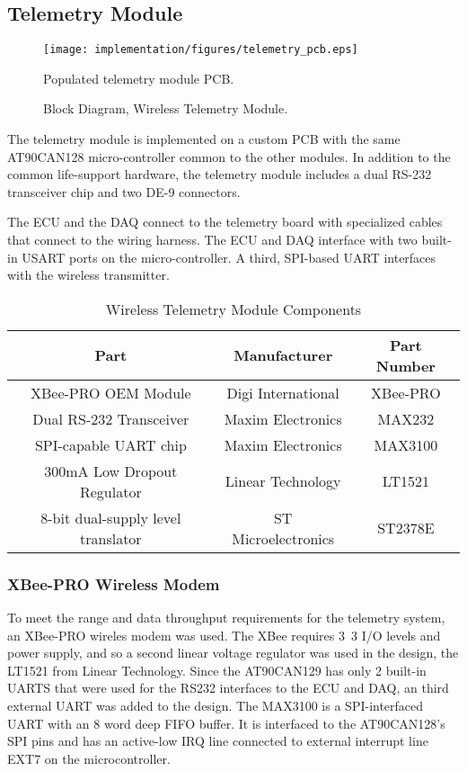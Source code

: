 \subsection{Telemetry Module}

\begin{figure}[H]
\centering
\texttt{[image: implementation/figures/telemetry\_pcb.eps]}
\caption{Populated telemetry module PCB.}\label{fig:telemetry_pcb}
\end{figure}


\begin{figure}[H]
\centering

\caption{Block Diagram, Wireless Telemetry Module.\label{fig:tele_tx_overview}}
\end{figure}

The telemetry module is implemented on a custom PCB with the same AT90CAN128 micro-controller common to the other modules. In addition to the common life-support hardware, the telemetry module includes a dual RS-232 transceiver chip and two DE-9 connectors. 

The ECU and the DAQ connect to the telemetry board with specialized cables that connect to the wiring harness. The ECU and DAQ interface with two built-in USART ports on the micro-controller. A third, SPI-based UART interfaces with the wireless transmitter.

\begin{table}[H]
  \caption{Wireless Telemetry Module Components\label{tab:telmetry_module_components}}
  \centering
    \begin{tabular}{|c|c|c|}
      \hline 
      Part & Manufacturer & Part Number\tabularnewline
      \hline
      \hline
      XBee-PRO OEM Module & Digi International & XBee-PRO\tabularnewline
      \hline 
      Dual RS-232 Transceiver & Maxim Electronics & MAX232\tabularnewline
      \hline 
      SPI-capable UART chip & Maxim Electronics & MAX3100\tabularnewline
      \hline 
      300mA Low Dropout Regulator & Linear Technology & LT1521\tabularnewline
      \hline
      8-bit dual-supply level translator & ST Microelectronics & ST2378E\tabularnewline
      \hline
    \end{tabular}
\end{table}


\subsubsection{XBee-PRO Wireless Modem}

To meet the range and data throughput requirements for the telemetry system, an XBee-PRO wireles modem was used. The XBee requires \unit{3.3}{\volt} I/O levels and power supply, and so a second linear voltage regulator was used in the design, the LT1521 from Linear Technology. Since the AT90CAN129 has only 2 built-in UARTS that were used for the RS232 interfaces to the ECU and DAQ, an third external UART was added to the design. The MAX3100 is a SPI-interfaced UART with an 8 word deep FIFO buffer. It is interfaced to the AT90CAN128's SPI pins and has an active-low IRQ line connected to external interrupt line EXT7 on the microcontroller. 

